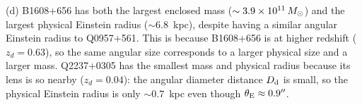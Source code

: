 (d) B1608+656 has both the largest enclosed mass ($\sim 3.9 \times
10^{11}\,M_{\odot}$) and the largest physical Einstein radius
($\sim 6.8$~kpc), despite having a similar angular Einstein
radius to Q0957+561.  This is because B1608+656 is at higher
redshift ($z_d = 0.63$), so the same angular size corresponds to
a larger physical size and a larger mass.  Q2237+0305 has the
smallest mass and physical radius because its lens is so nearby
($z_d = 0.04$): the angular diameter distance $D_{\mathrm{d}}$ is small,
so the physical Einstein radius is only $\sim 0.7$~kpc even though
$\theta_{\mathrm{E}} \approx 0.9''$. \checkmark
